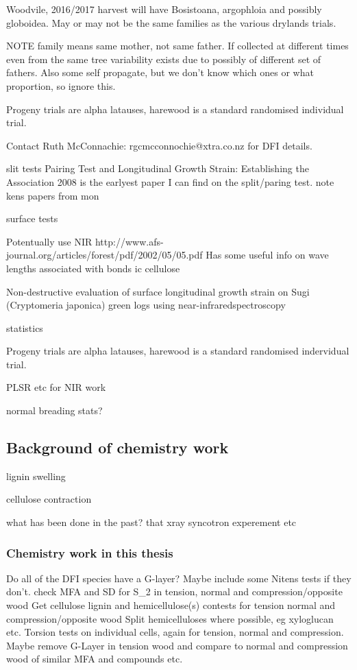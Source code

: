 \documentclass{article}
\begin{document}
Woodvile, 2016/2017 harvest will have Bosistoana, argophloia and possibly globoidea.
May or may not be the same families as the various drylands trials.

NOTE family means same mother, not same father.
If collected at different times even from the same tree variability exists due
to possibly of different set of fathers. Also some self propagate, but we don't
know which ones or what proportion, so ignore this.

Progeny trials are alpha latauses, harewood is a standard randomised individual
trial.

Contact Ruth McConnachie: rgcmcconnochie@xtra.co.nz for DFI details.

slit tests
Pairing Test and Longitudinal Growth Strain: Establishing the Association 2008
is the earlyest paper I can find on the split/paring test. note kens papers from
mon

surface tests

Potentually use NIR
http://www.afs-journal.org/articles/forest/pdf/2002/05/05.pdf
Has some useful info on wave lengths associated with bonds ic cellulose

Non-destructive evaluation of surface longitudinal growth strain
on Sugi (Cryptomeria japonica) green logs using near-infraredspectroscopy

statistics

Progeny trials are alpha latauses, harewood is a standard randomised indervidual
trial.

PLSR etc for NIR work

normal breading stats?

\subsection{Background of chemistry work}

lignin swelling

cellulose contraction

what has been done in the past?
that xray syncotron experement etc

\subsubsection{Chemistry work in this thesis}

Do all of the DFI species have a G-layer?
Maybe include some Nitens tests if they don't.
check MFA and SD for S\_2 in tension, normal and compression/opposite wood
Get cellulose lignin and hemicellulose(s) contests for tension normal and
compression/opposite wood Split hemicelluloses where possible, eg xyloglucan
etc.
Torsion tests on individual cells, again for tension, normal and compression. Maybe remove G-Layer
in tension wood and compare to normal and compression wood of similar MFA and compounds etc.
\end{document}
